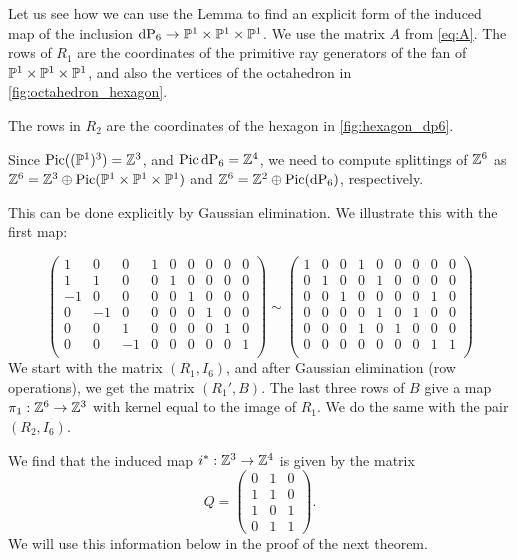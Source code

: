 \begin{example}
\label{example:p1p1p1}
Let us see how we can use the Lemma to find an explicit form of the induced map of the inclusion $\dP6 \to \P^1 \times \P^1 \times \P^1$. We use the matrix $A$ from \cref{eq:A}. The rows of $R_1$ are the coordinates of the primitive ray generators of the fan of $\P^1 \times \P^1 \times  \P^1$, and also the vertices of the octahedron in \cref{fig:octahedron_hexagon}.

The rows in $R_2$ are the coordinates of the hexagon in \cref{fig:hexagon_dp6}.

Since $\Pic( (\P^1)^3) = \Z^3$, and $\Pic \dP6=\Z^4$, we need to compute splittings of $\Z^6$ as $\Z^6 = \Z^3 \oplus \Pic (\P^1 \times \P^1 \times \P^1)$ and $\Z^6 = \Z^2 \oplus \Pic(\dP6)$, respectively.

This can be done explicitly by Gaussian elimination. We illustrate this with the first map:

\[
\left(
\begin{array}{ccc|cccccc}
1 & 0 & 0  & 1 & 0 & 0 & 0 & 0 & 0 \\
1 & 1 & 0  & 0 & 1 & 0 & 0 & 0 & 0 \\
-1& 0 & 0  & 0 & 0 & 1 & 0 & 0 & 0 \\
0 &-1 & 0  & 0 & 0 & 0 & 1 & 0 & 0 \\
0 & 0 & 1  & 0 & 0 & 0 & 0 & 1 & 0 \\
0 & 0 &-1  & 0 & 0 & 0 & 0 & 0 & 1 \\
\end{array} \right)
\sim \left(
\begin{array}{ccc|cccccc}
1 & 0 & 0  & 1 & 0 & 0 & 0 & 0 & 0 \\
0 & 1 & 0  & 0 & 1 & 0 & 0 & 0 & 0 \\
0 & 0 & 1  & 0 & 0 & 0 & 0 & 1 & 0 \\
0 & 0 & 0  & 0 & 1 & 0 & 1 & 0 & 0 \\
0 & 0 & 0  & 1 & 0 & 1 & 0 & 0 & 0 \\
0 & 0 & 0  & 0 & 0 & 0 & 0 & 1 & 1 \\
\end{array}\right)
\]
We start with the matrix $(R_1,I_6)$, and after Gaussian elimination (row operations), we get the matrix $(R_1',B)$. The last three rows of $B$ give a map $\pi_1: \Z^6 \to \Z^3$ with kernel equal to the image of $R_1$. We do the same with the pair $(R_2,I_6)$.

We find that the induced map $i^\ast: \Z^3 \to \Z^4$ is given by the matrix
\[
Q = \begin{pmatrix}
0 & 1 & 0 \\
1 & 1 & 0 \\
1 & 0 & 1 \\
0 & 1 & 1
\end{pmatrix}. 
\]
We will use this information below in the proof of the next theorem.
\end{example}

